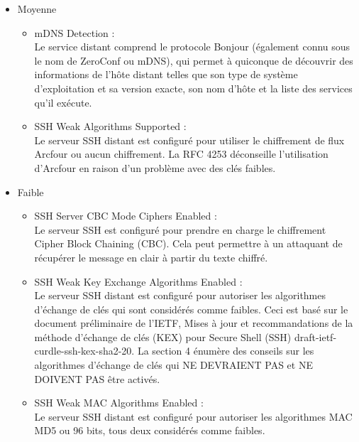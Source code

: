 \documentclass[a4paper]{article}
\begin{document}
\begin{itemize}
    \item Moyenne
    \begin{itemize}
        \item mDNS Detection :\\
        Le service distant comprend le protocole Bonjour (également connu sous le nom de ZeroConf ou mDNS), qui permet à quiconque de découvrir des informations de l'hôte distant telles que son type de système d'exploitation et sa version exacte, son nom d'hôte et la liste des services qu'il exécute.
        \item SSH Weak Algorithms Supported :\\
        Le serveur SSH distant est configuré pour utiliser le chiffrement de flux Arcfour ou aucun chiffrement. La RFC 4253 déconseille l'utilisation d'Arcfour en raison d'un problème avec des clés faibles. 
    \end{itemize}
    \item Faible
    \begin{itemize}
        \item SSH Server CBC Mode Ciphers Enabled :\\
        Le serveur SSH est configuré pour prendre en charge le chiffrement Cipher Block Chaining (CBC). Cela peut permettre à un attaquant de récupérer le message en clair à partir du texte chiffré.
        \item SSH Weak Key Exchange Algorithms Enabled : \\
        Le serveur SSH distant est configuré pour autoriser les algorithmes d'échange de clés qui sont considérés comme faibles. Ceci est basé sur le document préliminaire de l'IETF, Mises à jour et recommandations de la méthode d'échange de clés (KEX) pour Secure Shell (SSH) draft-ietf-curdle-ssh-kex-sha2-20. La section 4 énumère des conseils sur les algorithmes d'échange de clés qui NE DEVRAIENT PAS et NE DOIVENT PAS être activés.
        \item SSH Weak MAC Algorithms Enabled :\\
        Le serveur SSH distant est configuré pour autoriser les algorithmes MAC MD5 ou 96 bits, tous deux considérés comme faibles.
    \end{itemize}
\end{itemize}
\end{document}
